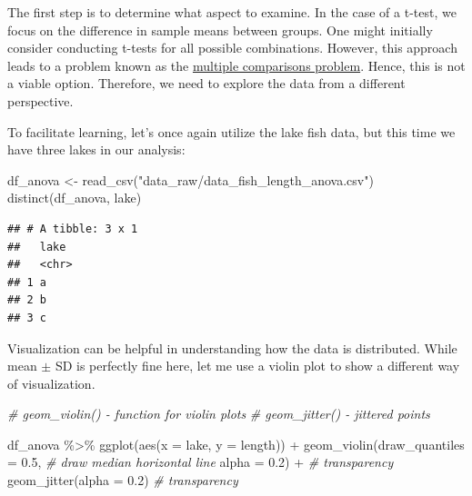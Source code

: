 \documentclass[
]{book}
\newenvironment{Shaded}{\begin{snugshade}}{\end{snugshade}}
\newcommand{\AttributeTok}[1]{\textcolor[rgb]{0.77,0.63,0.00}{#1}}
\newcommand{\CommentTok}[1]{\textcolor[rgb]{0.56,0.35,0.01}{\textit{#1}}}
\newcommand{\FloatTok}[1]{\textcolor[rgb]{0.00,0.00,0.81}{#1}}
\newcommand{\FunctionTok}[1]{\textcolor[rgb]{0.00,0.00,0.00}{#1}}
\newcommand{\NormalTok}[1]{#1}
\newcommand{\OtherTok}[1]{\textcolor[rgb]{0.56,0.35,0.01}{#1}}
\newcommand{\SpecialCharTok}[1]{\textcolor[rgb]{0.00,0.00,0.00}{#1}}
\newcommand{\StringTok}[1]{\textcolor[rgb]{0.31,0.60,0.02}{#1}}
\begin{document}
The first step is to determine what aspect to examine. In the case of a t-test, we focus on the difference in sample means between groups. One might initially consider conducting t-tests for all possible combinations. However, this approach leads to a problem known as the \href{https://en.wikipedia.org/wiki/Multiple_comparisons_problem\#:~:text=In\%20statistics\%2C\%20the\%20multiple\%20comparisons,based\%20on\%20the\%20observed\%20values.}{multiple comparisons problem}. Hence, this is not a viable option. Therefore, we need to explore the data from a different perspective.

To facilitate learning, let's once again utilize the lake fish data, but this time we have three lakes in our analysis:

\begin{Shaded}
\begin{Highlighting}[]
\NormalTok{df\_anova }\OtherTok{\textless{}{-}} \FunctionTok{read\_csv}\NormalTok{(}\StringTok{"data\_raw/data\_fish\_length\_anova.csv"}\NormalTok{)}
\FunctionTok{distinct}\NormalTok{(df\_anova, lake)}
\end{Highlighting}
\end{Shaded}

\begin{verbatim}
## # A tibble: 3 x 1
##   lake 
##   <chr>
## 1 a    
## 2 b    
## 3 c
\end{verbatim}

Visualization can be helpful in understanding how the data is distributed. While mean \(\pm\) SD is perfectly fine here, let me use a violin plot to show a different way of visualization.

\begin{Shaded}
\begin{Highlighting}[]
\CommentTok{\# geom\_violin() {-} function for violin plots}
\CommentTok{\# geom\_jitter() {-} jittered points}

\NormalTok{df\_anova }\SpecialCharTok{\%\textgreater{}\%} 
  \FunctionTok{ggplot}\NormalTok{(}\FunctionTok{aes}\NormalTok{(}\AttributeTok{x =}\NormalTok{ lake,}
             \AttributeTok{y =}\NormalTok{ length)) }\SpecialCharTok{+}
  \FunctionTok{geom\_violin}\NormalTok{(}\AttributeTok{draw\_quantiles =} \FloatTok{0.5}\NormalTok{, }\CommentTok{\# draw median horizontal line}
              \AttributeTok{alpha =} \FloatTok{0.2}\NormalTok{) }\SpecialCharTok{+} \CommentTok{\# transparency}
  \FunctionTok{geom\_jitter}\NormalTok{(}\AttributeTok{alpha =} \FloatTok{0.2}\NormalTok{) }\CommentTok{\# transparency}
\end{Highlighting}
\end{Shaded}
\end{document}
